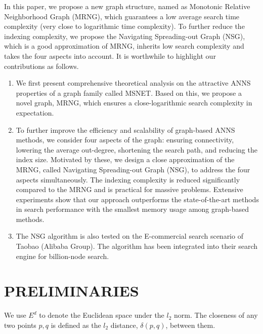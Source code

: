 \documentclass{vldb}
\begin{document}
In this paper, we propose a new graph structure, named as Monotonic Relative Neighborhood Graph (MRNG), which guarantees a low average search time complexity (very close to logarithmic time complexity). To further reduce the indexing complexity, we propose the Navigating Spreading-out Graph (NSG), which is a good approximation of MRNG, inherits low search complexity and takes the four aspects into account. It is worthwhile to highlight our contributions as follows.
\begin{enumerate}
\setlength{\itemsep}{1pt}
\setlength{\parskip}{0pt}
\setlength{\parsep}{0pt}
\item We first present comprehensive theoretical analysis on the attractive ANNS properties of a graph family called MSNET. Based on this, we propose a novel graph, MRNG, which ensures a close-logarithmic search complexity in expectation. 
\item To further improve the efficiency and scalability of graph-based ANNS methods, we consider four aspects of the graph: ensuring connectivity, lowering the average out-degree, shortening the search path, and reducing the index size. Motivated by these, we design a close approximation of the MRNG, called Navigating Spreading-out Graph (NSG), to address the four aspects simultaneously. The indexing complexity is reduced significantly compared to the MRNG and is practical for massive problems. Extensive experiments show that our approach outperforms the state-of-the-art methods in search performance with the smallest memory usage among graph-based methods.
\item The NSG algorithm is also tested on the E-commercial search scenario of Taobao (Alibaba Group). The algorithm has been integrated into their search engine for billion-node search.
\end{enumerate}



\section{PRELIMINARIES}
We use $E^d$ to denote the Euclidean space under the $l_2$ norm. The closeness of any two points $p,q$ is defined as the $l_2$ distance, $\delta(p,q)$, between them.
\end{document}
